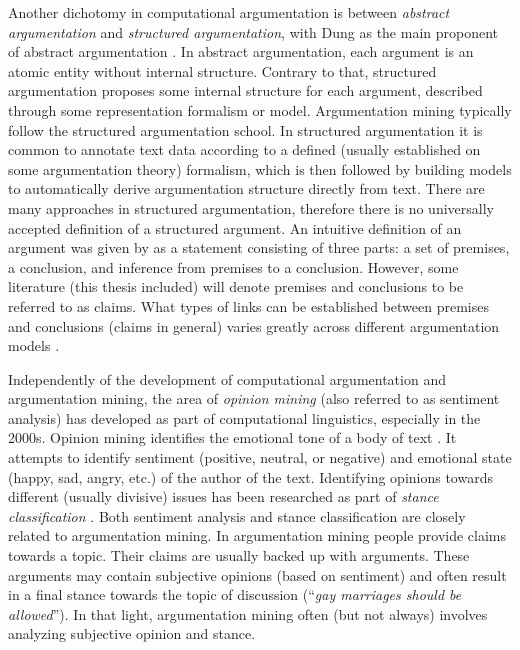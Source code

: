 Another dichotomy in computational argumentation is between 
\emph{abstract argumentation} and \emph{structured argumentation}, with
Dung as the main proponent of abstract argumentation \citep{dung1995acceptability,
bondarenko1997abstract}. In abstract argumentation, each argument is an
atomic entity without internal structure. Contrary to that, 
structured argumentation proposes some internal structure for each argument, 
described through some representation formalism or model. 
Argumentation mining typically follow the structured argumentation
school. In structured argumentation it is common to annotate text data according to
a defined (usually established on some argumentation theory) formalism, which is
then followed by building models to automatically derive argumentation
structure directly from text. There are many approaches in structured
argumentation, therefore there is no universally accepted definition of a
structured argument.  An intuitive definition of an argument was given by
\citet{walton1998new} as a statement consisting of three parts: a set of
premises, a conclusion, and inference from premises to a conclusion. However,
some literature (this thesis included) will denote premises and conclusions to
be referred to as claims.  What types of links can be established between
premises and conclusions (claims in general) varies greatly across different
argumentation models \citep{lippi2016argumentation}.

Independently of the development of computational argumentation and argumentation
mining, the area of \emph{opinion mining} (also referred to as sentiment
analysis) has developed as part of computational linguistics, especially in the
2000s. Opinion mining identifies the emotional tone of a body of text
\citep{pang2008opinion}.  It attempts to identify sentiment (positive, neutral,
or negative) and emotional state (happy, sad, angry, etc.) of the author of
the text.  Identifying opinions towards different (usually divisive) issues has
been researched as part of \emph{stance classification}
\citep{walker2012stance, hasan2013stance}.  Both sentiment analysis and stance
classification
are closely related to argumentation mining. In argumentation mining people
provide claims towards a topic. Their claims are usually backed up with arguments. These
arguments may contain subjective opinions (based on sentiment) and often result
in a final stance towards the topic of discussion (``\emph{gay marriages
should be allowed}''). In that light, argumentation mining often
(but not always) involves analyzing subjective opinion and stance. 


